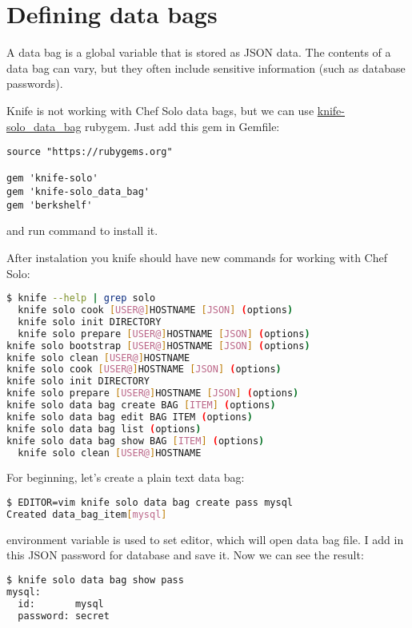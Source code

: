 \section{Defining data bags}

A data bag is a global variable that is stored as JSON data. The contents of a data bag can vary, but they often include sensitive information (such as database passwords).

Knife is not working with Chef Solo data bags, but we can use \href{http://thbishop.com/knife-solo\_data\_bag/}{knife-solo\_data\_bag} rubygem. Just add this gem in Gemfile:

\begin{lstlisting}[label=lst:my-cloud-chef-databag1,title=my-cloud/Gemfile]
source "https://rubygems.org"

gem 'knife-solo'
gem 'knife-solo_data_bag'
gem 'berkshelf'
\end{lstlisting}

and run command  to install it.

After instalation you knife should have new commands for working with Chef Solo:

\begin{lstlisting}[language=Bash,label=lst:my-cloud-chef-databag2]
$ knife --help | grep solo
  knife solo cook [USER@]HOSTNAME [JSON] (options)
  knife solo init DIRECTORY
  knife solo prepare [USER@]HOSTNAME [JSON] (options)
knife solo bootstrap [USER@]HOSTNAME [JSON] (options)
knife solo clean [USER@]HOSTNAME
knife solo cook [USER@]HOSTNAME [JSON] (options)
knife solo init DIRECTORY
knife solo prepare [USER@]HOSTNAME [JSON] (options)
knife solo data bag create BAG [ITEM] (options)
knife solo data bag edit BAG ITEM (options)
knife solo data bag list (options)
knife solo data bag show BAG [ITEM] (options)
  knife solo clean [USER@]HOSTNAME
\end{lstlisting}

For beginning, let's create a plain text data bag:

\begin{lstlisting}[language=Bash,label=lst:my-cloud-chef-databag3]
$ EDITOR=vim knife solo data bag create pass mysql
Created data_bag_item[mysql]
\end{lstlisting}

 environment variable is used to set editor, which will open data bag file. I add in this JSON password for database and save it. Now we can see the result:

\begin{lstlisting}[language=Bash,label=lst:my-cloud-chef-databag4]
$ knife solo data bag show pass
mysql:
  id:       mysql
  password: secret
\end{lstlisting}

